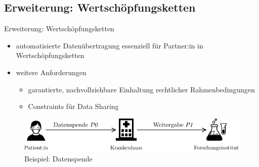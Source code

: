 \subsection{Erweiterung: Wertschöpfungsketten}

\begin{frame}{Erweiterung: Wertschöpfungsketten \footnotesize\cite{bothSolidBasedB2BData2025}}
    \begin{itemize}
        \item automatisierte Datenübertragung essenziell für Partner:in in Wertschöpfungsketten
        \item weitere Anforderungen
        \begin{itemize}
            \item garantierte, nachvollziehbare Einhaltung rechtlicher Rahmenbedingungen
            \item Constraints für Data Sharing
        \end{itemize}
    \end{itemize}

    \begin{figure}
        \includegraphics[width=\textwidth]{./assets/example_horizontal.drawio.pdf}
        \caption{Beispiel: Datenspende}
    \end{figure}
\end{frame}


